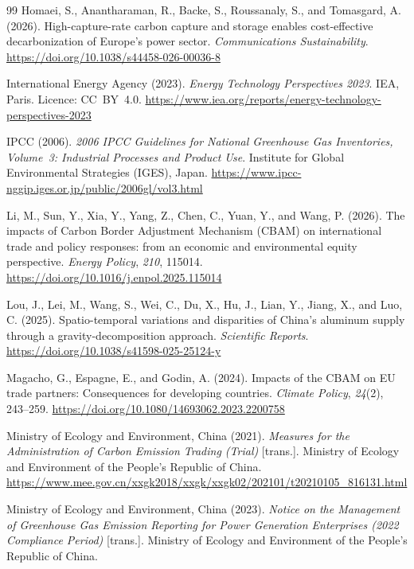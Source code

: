 \documentclass[letterpaper, 10pt, conference]{ieeeconf}
\begin{document}
\begin{thebibliography}{99}
Homaei, S., Anantharaman, R., Backe, S., Roussanaly, S., and Tomasgard, A. (2026).
High-capture-rate carbon capture and storage enables cost-effective decarbonization of {Europe}'s power sector.
\textit{Communications Sustainability}.
\url{https://doi.org/10.1038/s44458-026-00036-8}

International Energy Agency (2023).
\textit{Energy {Technology} {Perspectives} 2023}.
IEA, Paris. Licence: CC~BY~4.0.
\url{https://www.iea.org/reports/energy-technology-perspectives-2023}

IPCC (2006).
\textit{2006 {IPCC} Guidelines for National Greenhouse Gas Inventories,
Volume~3: Industrial Processes and Product Use}.
Institute for Global Environmental Strategies (IGES), Japan.
\url{https://www.ipcc-nggip.iges.or.jp/public/2006gl/vol3.html}

Li, M., Sun, Y., Xia, Y., Yang, Z., Chen, C., Yuan, Y., and Wang, P. (2026).
The impacts of {Carbon} {Border} {Adjustment} {Mechanism} ({CBAM}) on international trade and policy responses: from an economic and environmental equity perspective.
\textit{Energy Policy}, \textit{210}, 115014.
\url{https://doi.org/10.1016/j.enpol.2025.115014}

Lou, J., Lei, M., Wang, S., Wei, C., Du, X., Hu, J., Lian, Y., Jiang, X., and Luo, C. (2025).
Spatio-temporal variations and disparities of {China}'s aluminum supply through a gravity-decomposition approach.
\textit{Scientific Reports}.
\url{https://doi.org/10.1038/s41598-025-25124-y}

Magacho, G., Espagne, E., and Godin, A. (2024).
Impacts of the {CBAM} on {EU} trade partners: Consequences for developing countries.
\textit{Climate Policy}, \textit{24}(2), 243--259.
\url{https://doi.org/10.1080/14693062.2023.2200758}

Ministry of Ecology and Environment, China (2021).
\textit{Measures for the Administration of Carbon Emission Trading (Trial)} [trans.].
Ministry of Ecology and Environment of the People's Republic of China.
\url{https://www.mee.gov.cn/xxgk2018/xxgk/xxgk02/202101/t20210105_816131.html}

Ministry of Ecology and Environment, China (2023).
\textit{Notice on the Management of Greenhouse Gas Emission Reporting for Power Generation Enterprises (2022 Compliance Period)} [trans.].
Ministry of Ecology and Environment of the People's Republic of China.


\end{thebibliography}
\end{document}
